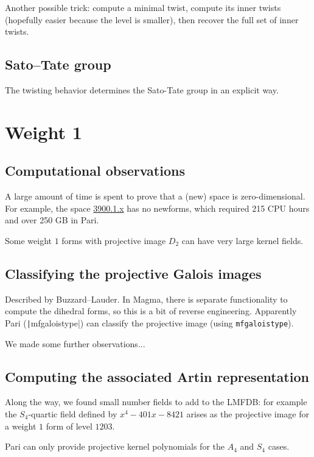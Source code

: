 \documentclass[11pt]{amsart}
\numberwithin{equation}{subsection}
\theoremstyle{plain}
\theoremstyle{definition}
\begin{document}
Another possible trick: compute a minimal twist, compute its inner twists (hopefully easier because the level is smaller), then recover the full set of inner twists.

\subsection{Sato--Tate group}

The twisting behavior determines the Sato-Tate group in an explicit way.  

\section{Weight 1} \label{sec:weight1}

\subsection{Computational observations}

A large amount of time is spent to prove that a (new) space is zero-dimensional.  For example, the space \href{http://cmfs.lmfdb.xyz/ModularForm/GL2/Q/holomorphic/3900/1/x/}{3900.1.x} has no newforms, which required 215 CPU hours and over 250 GB in Pari.  

Some weight $1$ forms with projective image $D_2$ can have very large kernel fields.

\subsection{Classifying the projective Galois images}

Described by Buzzard--Lauder.  In Magma, there is separate functionality to compute the dihedral forms, so this is a bit of reverse engineering.  Apparently Pari (\texttt|mfgaloistype|) can classify the projective image (using \verb|mfgaloistype|).

We made some further observations...

\subsection{Computing the associated Artin representation}

Along the way, we found small number fields to add to the LMFDB: for example the $S_4$-quartic field defined by $x^4-401x-8421$ arises as the projective image for a weight $1$ form of level $1203$.

Pari can only provide projective kernel polynomials for the $A_4$ and $S_4$ cases.  
\end{document}
